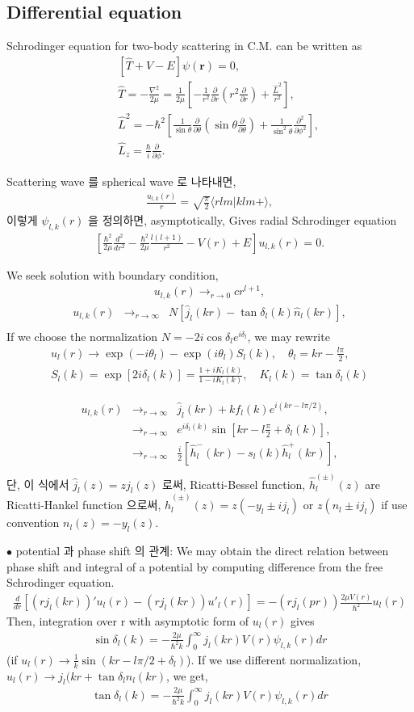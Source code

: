 \documentclass[10pt]{book}
\def\bm{\boldsymbol}
\newcommand{\bea}{\begin{eqnarray}}
\newcommand{\eea}{\end{eqnarray}}
\newcommand{\no}{\nonumber \\}
\newcommand{\del}{\partial}
\def\vr{{\bm r}}
\def\la{\langle}
\def\ra{\rangle}
\begin{document}
\subsection{Differential equation}
Schrodinger equation for two-body scattering 
in C.M. can be written as
\bea
& &[\hat{T}+V-E]\psi(\vr)=0,\no
& &\hat{T}=-\frac{\nabla^2}{2\mu}
          =\frac{1}{2\mu}\left[-\frac{1}{r^2}\frac{\del}{\del r}
          (r^2\frac{\del}{\del r})+\frac{\hat{L}^2}{r^2}
          \right],\no
& &\hat{L}^2=-\hbar^2\left[
        \frac{1}{\sin\theta}\frac{\del}{\del\theta}
        (\sin\theta\frac{\del}{\del \theta})
        +\frac{1}{\sin^2\theta}\frac{\del^2}{\del\phi^2}        
\right],\no
& &\hat{L}_z=\frac{\hbar}{i}\frac{\del}{\del\phi}.         
\eea

Scattering wave 를 spherical wave 로 나타내면,
\bea
\frac{u_{l,k}(r)}{r}=\sqrt{\frac{\pi}{2}}\la r lm|k lm+\ra,
\eea
이렇게 $\psi_{l,k}(r)$ 을 정의하면,
asymptotically, 
Gives radial Schrodinger equation
\bea
\left[\frac{\hbar^2}{2\mu}\frac{d^2}{dr^2}-\frac{\hbar^2}{2\mu}\frac{l(l+1)}{r^2}-V(r)+E\right]u_{l,k}(r)=0.
\eea

We seek solution with boundary condition,
\bea
u_{l,k}(r)\to_{r\to 0} c r^{l+1},
\eea
\bea
u_{l,k}(r)&\rightarrow_{r\to \infty}& N[\hat{j}_{l}(kr)-\tan\delta_l(k)\hat{n}_l(kr)], \no  
\eea
If we choose the normalization $N=-2i \cos\delta_l e^{i\delta_l}$,
we may rewrite
\bea
u_l(r)\to \exp(-i\theta_l)-\exp(i\theta_l)S_l(k),\quad
\theta_l=kr-\frac{l\pi}{2},\no
S_l(k)=\exp[2i\delta_l(k)]=\frac{1+i K_l(k)}{1-iK_l(k)},
\quad K_l(k)=\tan\delta_l(k)
\eea


\bea
u_{l,k}(r)&\rightarrow_{r\to \infty}& \hat{j}_{l}(kr)+k f_l(k)e^{i(kr-l\pi/2)},\no
      &\rightarrow_{r\to \infty}& e^{i\delta_l(k)}\sin[kr-l\frac{\pi}{2}+\delta_l(k)],\no
                 &\rightarrow_{r\to\infty}&\frac{i}{2}[\hat{h}_l^{-}(kr)-s_l(k)\hat{h}_l^{+}(kr)],\no                 
\eea
단, 이 식에서 $\hat{j}_{l}(z)=z j_{l}(z)$ 로써, Ricatti-Bessel
function, 
$\hat{h}^{(\pm)}_l(z)$ are Ricatti-Hankel function 으로써,
$\hat{h}^{(\pm)}_l(z)=z(-y_l \pm i j_l)$ or $z(n_l\pm i j_l)$
if use convention $n_l(z)=-y_l(z)$.



$\bullet$ potential 과 phase shift 의 관계: We may obtain the direct relation between
phase shift and integral of a potential by computing difference from the 
free Schrodinger equation.
\bea 
\frac{d}{dr}[(rj_l(k r))' u_{l}(r)-(rj_l(k r)) u'_{l}(r)]
=-(r j_l(pr))\frac{2\mu V(r)}{\hbar^2} u_l(r)
\eea 
Then, integration over r with asymptotic form of $u_l(r)$ gives 
\bea
\sin \delta_l(k)=-\frac{2\mu}{\hbar^2 k}\int_0^\infty j_l(kr) V(r) \psi_{l,k}(r) dr
\eea
(if $u_l(r)\to\frac{1}{k}\sin(kr-l\pi/2+\delta_l)$).
If we use different normalization, $u_l(r)\to j_l(kr+\tan\delta_l n_l(kr)$,
we get,
\bea 
\tan \delta_l(k)=-\frac{2\mu}{\hbar^2 k}\int_0^\infty j_l(kr) V(r) \psi_{l,k}(r) dr
\eea 
\end{document}
